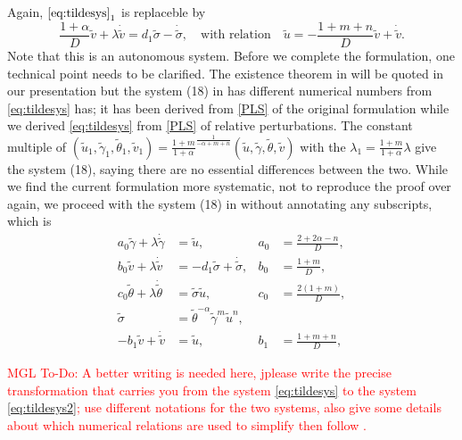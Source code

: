 \documentclass[a4paper,11pt]{article}
\def\tg{{\tilde{\gamma}}}
\def\tv{{\tilde{v}}}
\def\tth{{\tilde{\theta}}}
\def\ts{{\tilde{\sigma}}}
\def\tu{{\tilde{u}}}
\def\dtg{{\dot{\tilde{\gamma}}}}
\def\dtv{{\dot{\tilde{v}}}}
\def\dtth{{\dot{\tilde{\theta}}}}
\def\dts{{\dot{\tilde{\sigma}}}}
\newcommand{\tcr}{\textcolor{red}}
\theoremstyle{remark}
\begin{document}
Again, $\eqref{eq:tildesys}_1$ is replaceble by
$$\frac{1+ \alpha}{D} \tv + \lambda \dot\tv = d_1 \ts -\dot\ts, \quad \text{with relation} \quad \tu = -\frac{1+m+n}{D}\tv + \dot\tv.$$
Note that this is an autonomous system. Before we complete the formulation, one technical point needs to be clarified. The existence theorem in \cite{LKT17} will be quoted in our presentation but the system (18) in \cite{LKT17} has different numerical numbers from \eqref{eq:tildesys} has; it has been derived from \eqref{PLS} of the original formulation while we derived \eqref{eq:tildesys} from \eqref{PLS} of relative perturbations. The constant multiple of $(\tu_1,\tg_1,\tth_1,\tv_1)=\frac{1+m}{1+\alpha}^{\frac{1}{-\alpha+m+n}}(\tu,\tg,\tth,\tv)$ with the $\lambda_1 =\frac{1+m}{1+\alpha}\lambda$ give the system (18), saying there are no essential differences between the two. While we find the current formulation more systematic, not to reproduce the proof over again, we proceed with the system (18) in \cite{LKT17} without annotating any subscripts, which is
\begin{equation} \label{eq:tildesys2}
 \begin{aligned}
  a_0\tg + \lambda\dtg &=\tu, & a_0&=\frac{2+2\alpha-n}{D},\\
  b_0\tv + \lambda\dtv &=-d_1 \ts + \dts,& b_0&=\frac{1+m}{D},\\
  c_0\tth+ \lambda\dtth&=\ts\tu, & c_0&=\frac{2(1+m)}{D},\\
  \ts &=\tth^{-\alpha}\tg^m\tu^n, \\
  -b_1\tv+\dtv &= \tu, & b_1&=\frac{1+m+n}{D},
 \end{aligned}
\end{equation}

\noindent
\tcr{MGL To-Do:    A better writing is needed here, jplease write the precise transformation that carries you
 from the system \eqref{eq:tildesys} to the system \eqref{eq:tildesys2}; use different notations for the two systems, 
 also give some details about which
 numerical relations are used to simplify then follow \cite{LKT17}. }
\end{document}
